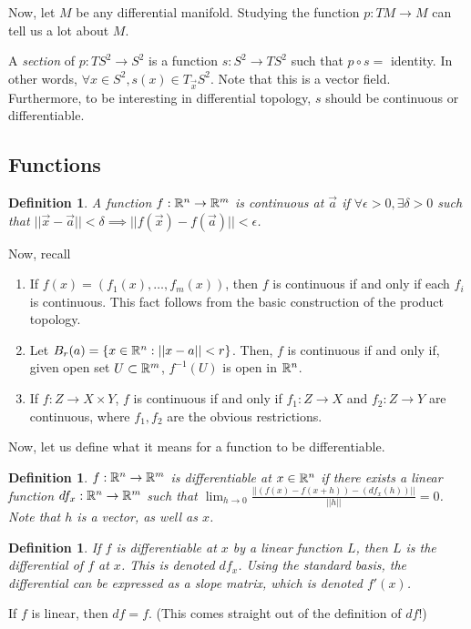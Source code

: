 \documentclass[11pt,leqno,oneside]{amsart}
\theoremstyle{mystyle} \newtheorem{thrm}[thm]{Theorem}
\theoremstyle{mystyle} \newtheorem{defi}[thm]{Definition}
\begin{document}
Now, let $M$ be any differential manifold. Studying the function $p: TM \to M$
can tell us a lot about $M$.

\begin{example}
	A \emph{section} of $p: TS^2 \to S^2$ is a function $s: S^2 \to TS^2$ such
	that $p \circ s =$ identity. In other words, $\forall x \in S^2, s(x) \in
	T_{\vec{x}}S^2$. Note that this is a vector field. Furthermore, to be
	interesting in differential topology, $s$ should be continuous or
	differentiable.
\end{example}



\subsection{Functions}

\begin{defi}
	A function $f: {\mathbb R}^n \to {\mathbb R}^m$ is continuous at $\vec{a}$ if $\forall
	\epsilon > 0, \exists \delta > 0$ such that $||\vec{x}-\vec{a}|| < \delta
	\implies ||f(\vec{x}) - f(\vec{a})|| < \epsilon$.
\end{defi}
Now, recall \begin{enumerate}
	\item If $f(x) = (f_1(x), \ldots, f_m(x))$, then $f$ is continuous if and
		only if each $f_i$ is continuous. This fact follows from the basic
		construction of the product topology.
	\item Let $B_r(a) = \{x \in {\mathbb R}^n : ||x-a|| < r\}$. Then, $f$ is continuous
		if and only if, given open set $U \subset {\mathbb R}^m$, $f^{-1}(U)$ is open in
		${\mathbb R}^n$.
	\item If $f: Z \to X \times Y$, $f$ is continuous if and only if $f_1: Z
		\to X$ and $f_2: Z \to Y$ are continuous, where $f_1, f_2$ are the
		obvious restrictions.
\end{enumerate}

Now, let us define what it means for a function to be differentiable.
\begin{defi}
	$f :{\mathbb R}^n \to {\mathbb R}^m$ is \emph{differentiable} at $x \in {\mathbb R}^n$ if there exists a linear function $df_x : {\mathbb R}^n \to {\mathbb R}^m$  such that $\lim_{h \to 0} \frac{|| (f(x)-f(x+h)) - (df_x(h)) ||}{||h||} = 0$.  Note that $h$ is a vector, as well as $x$.
\end{defi}
\begin{defi}
	If $f$ is differentiable at $x$ by a linear function $L$, then $L$ is the \emph{differential} of $f$ at $x$.  This is denoted $df_x$.  Using the standard basis, the differential can be expressed as a slope matrix, which is denoted $f'(x)$.
\end{defi}
\begin{cor}
	If $f$ is linear, then $df = f$.  (This comes straight out of the definition of $df$!)
\end{cor}
\end{document}
